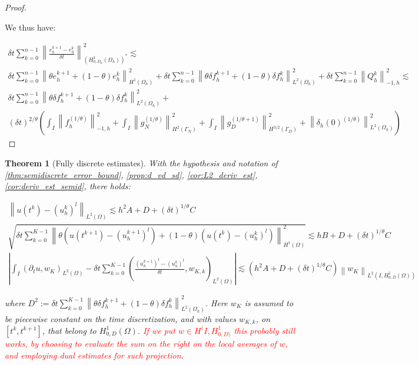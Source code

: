 \documentclass[english,a4paper,9pt,oneside]{scrbook}	%
\theoremstyle{break}
\newtheorem{thm}[equation]{Theorem}
\newenvironment{mproof}[1][\proofname]{%
  \begin{proof}[#1]$ $\par\nobreak\ignorespaces
}{%
  \end{proof}
}
\renewcommand*{\proofname}{Proof}
\theoremstyle{remark}
\newcommand{\ds}{\displaystyle}
\newcommand{\norm}[1]{\left\lVert#1\right\rVert}
\begin{document}
\begin{appendices}
\begin{mproof}
We thus have:

\begin{align*}
\delta t \sum_{k=0}^{n-1} \norm{ \frac{e_{h}^{k+1}-e_h^k}{\delta t}}_{(H^1_{0,D_h}(\Omega_h))^*}^2 \lesssim  \\\delta t \sum_{k=0}^{n-1}\norm{\theta e_h^{k+1}+(1-\theta)e^k_h}_{H^1(\Omega_h)}^2 + \delta t \sum_{k=0}^{n-1} \norm{\theta \delta f_h^{k+1}+(1-\theta)\delta f_h^k}_{L^2(\Omega_h)}^2+ \delta t \sum_{k=0}^{n-1} \norm{Q_h^k}_{-1,h}^2\lesssim\\
\delta t \sum_{k=0}^{n-1} \norm{\theta \delta f_h^{k+1}+(1-\theta)\delta f_h^k}_{L^2(\Omega_h)}^2 +\\
(\delta t)^{2/\theta} \left( \int_I \norm{f^{(1/\theta)}_h}_{-1,h}^2+\int_I\norm{ g_{N}^{(1/\theta)}}_{H^{2}(\Gamma_{N})}^2 + \int_I\norm{g_D^{(1/\theta+1)}}_{H^{3/2}(\Gamma_D)}^2 + \norm{\delta_{h}(0)^{(1/\theta)}}_{L^2(\Omega_h)}^2\right)
\end{align*}

\end{mproof}

\begin{thm}[Fully discrete estimates]
\label{thm:fully_discr_est_par}
With the hypothesis and notation of \cref{thm:semidiscrete_error_bound}, \cref{prop:d_vd_sd}, \cref{cor:L2_deriv_est}, \cref{cor:deriv_est_semid}, there holds:

\begin{align*}
	\norm{u(t^k)-(u_h^k)^l}_{L^2(\Omega)}\lesssim  h^2 A  + D +  (\delta t)^{1/\theta}C\\
	\sqrt{\delta t \sum_{k=0}^{K-1} \norm{\theta(u(t^{k+1}) - (u_h^{k+1})^l) + (1-\theta)(u(t^{k}) - (u_h^{k})^l)}_{H^1(\Omega)}^2} \lesssim hB + D + (\delta t)^{1/\theta} C\\
	\left | \int_I (\partial_t u , w_K)_{L^2(\Omega)}-\delta t \sum_{k=0}^{K-1}\left ( \frac{(u^{k+1}_h)^l - (u_h^k)^l}{\delta t} , w_{K,k}\right )_{L^2(\Omega)} \right |\lesssim \left ( h^2A + D + (\delta t)^{1/\theta} C\right ) \norm{w_K}_{L^2(I,H^1_{0,D}(\Omega))}
\end{align*}

where $D^2:= \ds {\delta t\sum_{k=0}^{K-1} \norm{\theta \delta f_h^{k+1}+(1-\theta)\delta f_h^k}_{L^2(\Omega_h)}^2}$. Here $w_K$ is assumed to be piecewise constant on the time discretization, and with values $w_{K,k}$, on $[t^k,t^{k+1}]$, that belong to $H^1_{0,D}(\Omega)$. \textcolor{red}{If we put $w \in H^(I,H^1_{0,D)}$ this probably still works, by choosing to evaluate the sum on the right on the local averages of $w$, and employing dual estimates for such projection}.
\end{thm}


\end{appendices}
\end{document}
